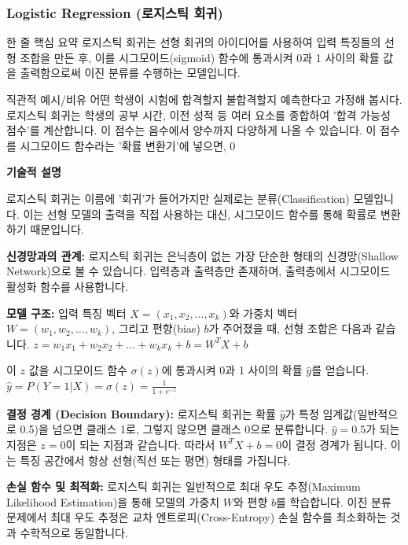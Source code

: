 \documentclass[11pt,a4paper]{article}
\begin{document}
\subsubsection{Logistic Regression (로지스틱 회귀)}

\begin{summarybox}{한 줄 핵심 요약}
로지스틱 회귀는 선형 회귀의 아이디어를 사용하여 입력 특징들의 선형 조합을 만든 후, 이를 시그모이드(sigmoid) 함수에 통과시켜 0과 1 사이의 확률 값을 출력함으로써 이진 분류를 수행하는 모델입니다.
\end{summarybox}

\begin{examplebox}{직관적 예시/비유}
어떤 학생이 시험에 합격할지 불합격할지 예측한다고 가정해 봅시다. 로지스틱 회귀는 학생의 공부 시간, 이전 성적 등 여러 요소를 종합하여 '합격 가능성 점수'를 계산합니다. 이 점수는 음수에서 양수까지 다양하게 나올 수 있습니다. 이 점수를 시그모이드 함수라는 '확률 변환기'에 넣으면, 0%
\end{examplebox}

\textbf{기술적 설명}

로지스틱 회귀는 이름에 '회귀'가 들어가지만 실제로는 분류(Classification) 모델입니다. 이는 선형 모델의 출력을 직접 사용하는 대신, 시그모이드 함수를 통해 확률로 변환하기 때문입니다.

\textbf{신경망과의 관계:}
로지스틱 회귀는 은닉층이 없는 가장 단순한 형태의 신경망(Shallow Network)으로 볼 수 있습니다. 입력층과 출력층만 존재하며, 출력층에서 시그모이드 활성화 함수를 사용합니다.

\textbf{모델 구조:}
입력 특징 벡터 $X = (x_1, x_2, \dots, x_k)$와 가중치 벡터 $W = (w_1, w_2, \dots, w_k)$, 그리고 편향(bias) $b$가 주어졌을 때, 선형 조합은 다음과 같습니다.
$z = w_1 x_1 + w_2 x_2 + \dots + w_k x_k + b = W^T X + b$

이 $z$ 값을 시그모이드 함수 $\sigma(z)$에 통과시켜 0과 1 사이의 확률 $\hat{y}$를 얻습니다.
$\hat{y} = P(Y=1|X) = \sigma(z) = \frac{1}{1 + e^{-z}}$

\textbf{결정 경계 (Decision Boundary):}
로지스틱 회귀는 확률 $\hat{y}$가 특정 임계값(일반적으로 0.5)을 넘으면 클래스 1로, 그렇지 않으면 클래스 0으로 분류합니다. $\hat{y} = 0.5$가 되는 지점은 $z = 0$이 되는 지점과 같습니다. 따라서 $W^T X + b = 0$이 결정 경계가 됩니다. 이는 특징 공간에서 항상 선형(직선 또는 평면) 형태를 가집니다.

\textbf{손실 함수 및 최적화:}
로지스틱 회귀는 일반적으로 최대 우도 추정(Maximum Likelihood Estimation)을 통해 모델의 가중치 $W$와 편향 $b$를 학습합니다. 이진 분류 문제에서 최대 우도 추정은 교차 엔트로피(Cross-Entropy) 손실 함수를 최소화하는 것과 수학적으로 동일합니다.
\end{document}
